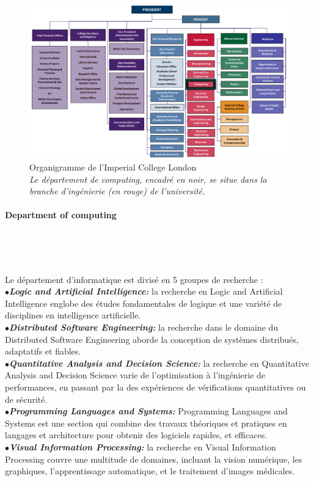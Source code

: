 \documentclass[10pt]{report}
\begin{document}
	\begin{figure}[h!]
		\begin{center}
			\includegraphics[width=18cm]{Reports/figures/College-Organisation.pdf}
		\end{center}
		\caption{Organigramme de l'Imperial College London \\ \textit{Le département de computing, encadré en noir, se situe dans la branche d'ingénierie (en rouge) de l'université.}}
		\label{Organigramme de l'Imperial College London}
	\end{figure}
	
	\paragraph{Department of computing}~\par~\par
	
	Le département d'informatique est divisé en 5 groupes de recherche : 
	\\{$\bullet$}\textit{\textbf{Logic and Artificial Intelligence:}} la recherche en Logic and Artificial Intelligence englobe des études fondamentales de logique et une variété de disciplines en intelligence artificielle.
	\\{$\bullet$}\textit{\textbf{Distributed Software Engineering:}}	la recherche dans le domaine du Distributed Software Engineering aborde la conception de systèmes distribués, adaptatifs et fiables.
	\\{$\bullet$}\textit{\textbf{Quantitative Analysis and Decision Science:}} la recherche en Quantitative Analysis and Decision Science varie de l'optimisation à l'ingénierie de performances, en passant par la des expériences de vérifications quantitatives ou de sécurité.
	\\{$\bullet$}\textit{\textbf{Programming Languages and Systems:}} Programming Languages and Systems est une section qui combine des travaux théoriques et pratiques en langages et architecture pour obtenir des logiciels rapides, et efficaces.
	\\{$\bullet$}\textit{\textbf{Visual Information Processing:}} la recherche en Visual Information Processing couvre une multitude de domaines, incluant la vision numérique, les graphiques, l'apprentissage automatique, et le traitement d'images médicales.
	 
\end{document}

